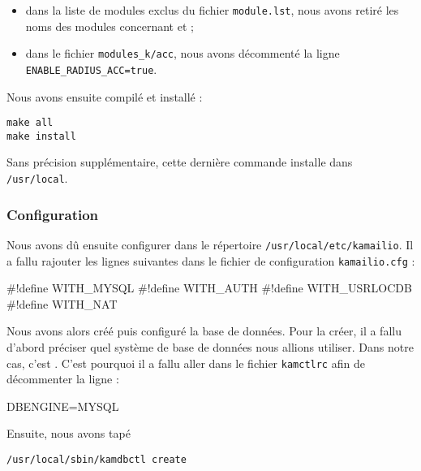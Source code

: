 \begin{itemize}
	\item{dans la liste de modules exclus du fichier \texttt{module.lst}, nous avons retiré les noms des modules concernant {\my} et {\rad}} ;
	\item{dans le fichier \texttt{modules\_k/acc}, nous avons décommenté la ligne \texttt{ENABLE\_RADIUS\_ACC=true}}.
\end{itemize}

Nous avons ensuite compilé et installé {\kam} :

\begin{verbatim}
make all
make install
\end{verbatim}

Sans précision supplémentaire, cette dernière commande installe {\kam} dans \texttt{/usr/local}.

\subsubsection{Configuration}

Nous avons dû ensuite configurer {\kam} dans le répertoire \texttt{/usr/local/etc/kamailio}. Il a fallu rajouter les lignes suivantes dans le fichier de configuration \texttt{kamailio.cfg} :

\begin{kamcf}
#!define WITH_MYSQL
#!define WITH_AUTH
#!define WITH_USRLOCDB
#!define WITH_NAT
\end{kamcf}

Nous avons alors créé puis configuré la base de données. Pour la créer, il a fallu d'abord préciser quel système de base de données nous allions utiliser. Dans notre cas, c'est \my. C'est pourquoi il a fallu aller dans le fichier \texttt{kamctlrc} afin de décommenter la ligne :

\begin{kamcf}
DBENGINE=MYSQL
\end{kamcf}

Ensuite, nous avons tapé 
\begin{verbatim}
/usr/local/sbin/kamdbctl create
\end{verbatim}
\todo
